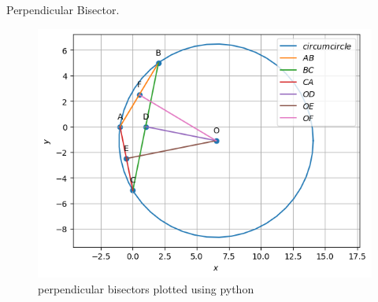 \begin{table}[H]
        \centering
        
        \caption{Perpendicular Bisector.}
        \label{tab:perp_bisec}
    \end{table}
\begin{figure}[H]
\includegraphics[width=\columnwidth]{1.4/figs/perp_bisec.png}
\caption{perpendicular bisectors plotted using python}
\label{fig:i_perp_bisec_py}
\end{figure}

